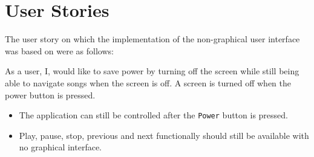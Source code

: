 \section{User Stories}
The user story on which the implementation of the non-graphical user interface was based on were as follows:

{As a user, I, would like to save power by turning off the screen while still being able to navigate songs when the screen is off.
A screen is turned off when the power button is pressed.}
{\begin{itemize}
\item The application can still be controlled after the \texttt{Power} button is pressed.
\item Play, pause, stop, previous and next functionally should still be available with no graphical interface.
\end{itemize}}

